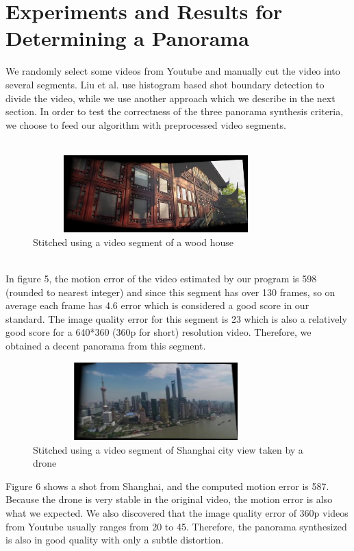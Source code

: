 \documentclass[12pt]{article}
\begin{document}
\section{Experiments and Results for Determining a Panorama}
We randomly select some videos from Youtube and manually cut the video into several segments. Liu et al.\cite{Liu} use histogram based shot boundary detection to divide the video, while we use another approach which we describe in the next section. In order to test the correctness of the three panorama synthesis criteria, we choose to feed our algorithm with preprocessed video segments.\\
\\
\begin{figure}[h]
	\centering
	\includegraphics[width=9.5cm, height=3cm]{building562-691}
	\caption{Stitched using a video segment of a wood house}
\end{figure}\\
In figure 5, the motion error of the video estimated by our program is 598 (rounded to nearest integer) and since this segment has over 130 frames, so on average each frame has 4.6 error which is considered a good score in our standard. The image quality error for this segment is 23 which is also a relatively good score for a 640*360 (360p for short) resolution video. Therefore, we obtained a decent panorama from this segment.
\begin{figure}[h]
	\centering
	\includegraphics[width=9.5cm, height=3cm]{shanghai1309-1440}
	\caption{Stitched using a video segment of Shanghai city view taken by a drone}
\end{figure}
Figure 6 shows a shot from Shanghai, and the computed motion error is 587. Because the drone is very stable in the original video, the motion error is also what we expected. We also discovered that the image quality error of 360p videos from Youtube usually ranges from 20 to 45. Therefore, the panorama synthesized is also in good quality with only a subtle distortion. 
\end{document}
